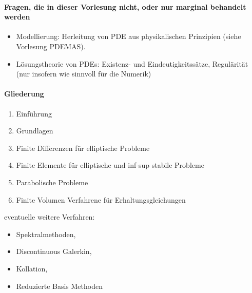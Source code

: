 \paragraph{Fragen, die in dieser Vorlesung nicht, oder nur marginal behandelt werden}

\begin{itemize}
	\item
		Modellierung: Herleitung von PDE aus physikalischen Prinzipien (siehe Vorlesung PDEMAS).
	\item
		Lösungstheorie von PDEs: Existenz- und Eindeutigkeitssätze, Regulärität (nur insofern wie sinnvoll für die Numerik)
\end{itemize}

\paragraph{Gliederung}

\begin{enumerate}[1.,start=0]
	\item
		Einführung
	\item
		Grundlagen
	\item
		Finite Differenzen für elliptische Probleme
	\item
		Finite Elemente für elliptische und inf-sup stabile Probleme
	\item
		Parabolische Probleme
	\item
		Finite Volumen Verfahrene für Erhaltungsgleichungen
\end{enumerate}

eventuelle weitere Verfahren:
\begin{itemize}
	\item
		Spektralmethoden,
	\item
		Discontinuous Galerkin,
	\item
		Kollation,
	\item
		Reduzierte Basis Methoden
\end{itemize}

